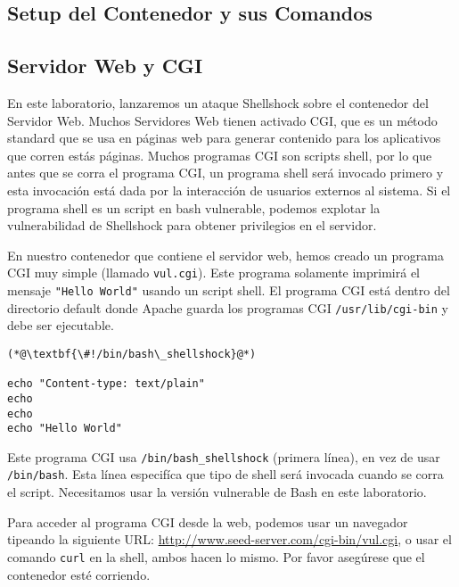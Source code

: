 \subsection{Setup del Contenedor y sus Comandos}




\subsection{Servidor Web y CGI}

En este laboratorio, lanzaremos un ataque Shellshock sobre el contenedor del Servidor Web. Muchos Servidores Web tienen activado CGI, que es un método standard 
que se usa en páginas web para generar contenido para los aplicativos que corren estás páginas. Muchos programas CGI son scripts shell, por lo que antes que se corra el programa CGI, un programa shell será invocado primero y esta invocación está dada por la interacción de usuarios externos al sistema. Si el programa shell es un script en bash vulnerable, podemos explotar la vulnerabilidad de Shellshock para obtener privilegios en el servidor.

En nuestro contenedor que contiene el servidor web, hemos creado un programa CGI muy simple (llamado \texttt{vul.cgi}). 
Este programa solamente imprimirá el mensaje {\tt "Hello World"} usando un script shell.
El programa CGI está dentro del directorio default donde Apache guarda los programas CGI \texttt{/usr/lib/cgi-bin} y debe ser ejecutable.

\begin{lstlisting}[caption=\texttt{vul.cgi}] 
(*@\textbf{\#!/bin/bash\_shellshock}@*)          

echo "Content-type: text/plain"
echo
echo
echo "Hello World"
\end{lstlisting}

Este programa CGI usa \texttt{/bin/bash\_shellshock} (primera línea), en vez de usar \texttt{/bin/bash}. Esta línea especifíca que tipo de shell será invocada cuando se corra el script. Necesitamos usar la versión vulnerable de Bash en este laboratorio.

Para acceder al programa CGI desde la web, podemos usar un navegador tipeando la siguiente URL: \url{http://www.seed-server.com/cgi-bin/vul.cgi}, o usar el  comando {\tt curl} en la shell, ambos hacen lo mismo. Por favor asegúrese que el contenedor esté corriendo.


